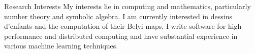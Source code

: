 \begin{rSection}{Research Interests}
My interests lie in computing and mathematics, particularly number theory and symbolic algebra. 
I am currently interested in dessins d'enfants and the computation of their Belyi maps. I write software for high-performance and distributed computing and have substantial experience in various machine learning techniques.
\end{rSection}